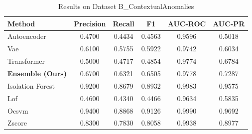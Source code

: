 \begin{table}[htbp]
\caption{Results on Dataset B_ContextualAnomalies}
\begin{center}
\begin{tabular}{|l|c|c|c|c|c|}
\hline
\textbf{Method} & \textbf{Precision} & \textbf{Recall} & \textbf{F1} & \textbf{AUC-ROC} & \textbf{AUC-PR} \\
\hline
Autoencoder & 0.4700 & 0.4434 & 0.4563 & 0.9596 & 0.5018 \\
Vae & 0.6100 & 0.5755 & 0.5922 & 0.9742 & 0.6034 \\
Transformer & 0.5000 & 0.4717 & 0.4854 & 0.9774 & 0.6784 \\
\hline
\textbf{Ensemble (Ours)} & 0.6700 & 0.6321 & 0.6505 & 0.9778 & 0.7287 \\
Isolation Forest & 0.9200 & 0.8679 & 0.8932 & 0.9983 & 0.9575 \\
Lof & 0.4600 & 0.4340 & 0.4466 & 0.9634 & 0.5835 \\
Ocsvm & 0.9400 & 0.8868 & 0.9126 & 0.9990 & 0.9692 \\
Zscore & 0.8300 & 0.7830 & 0.8058 & 0.9938 & 0.8977 \\
\hline
\hline
\end{tabular}
\label{tab:results_b_contextualanomalies}
\end{center}
\end{table}